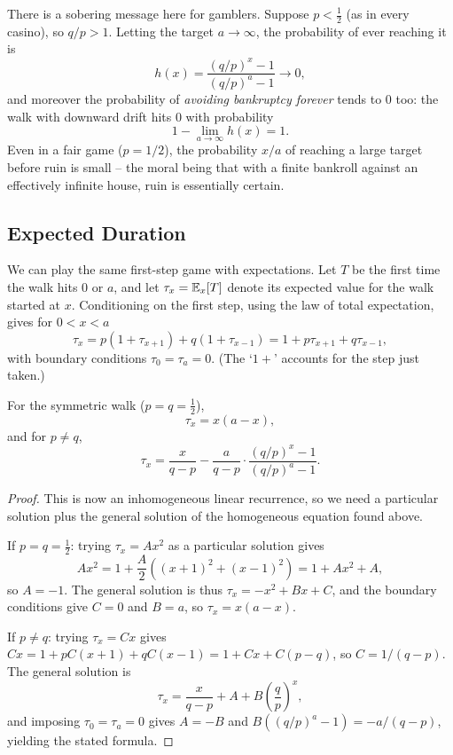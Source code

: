 \documentclass[a4paper]{scrartcl}
\begin{document}
There is a sobering message here for gamblers. Suppose $p < \frac12$ (as in every casino), so $q/p > 1$. Letting the target $a \rightarrow \infty$, the probability of ever reaching it is
$$
h(x) = \frac{(q/p)^x - 1}{(q/p)^a - 1} \longrightarrow 0,
$$
and moreover the probability of \emph{avoiding bankruptcy forever} tends to $0$ too: the walk with downward drift hits $0$ with probability
$$
1 - \lim_{a \to \infty}h(x) = 1.
$$
Even in a fair game ($p = 1/2$), the probability $x/a$ of reaching a large target before ruin is small -- the moral being that with a finite bankroll against an effectively infinite house, ruin is essentially certain.

\subsection{Expected Duration}

We can play the same first-step game with expectations. Let $T$ be the first time the walk hits $0$ or $a$, and let $\tau_x = \mathbb{E}_x[T]$ denote its expected value for the walk started at $x$. Conditioning on the first step, using the law of total expectation, gives for $0 < x < a$
$$
\tau_x = p(1 + \tau_{x + 1}) + q(1 + \tau_{x - 1}) = 1 + p\tau_{x+1} + q\tau_{x - 1},
$$
with boundary conditions $\tau_0 = \tau_a = 0$. (The `$1 +$' accounts for the step just taken.)

\begin{proposition}
	For the symmetric walk ($p = q = \frac12$),
	$$
	\tau_x = x(a - x),
	$$
	and for $p \neq q$,
	$$
	\tau_x = \frac{x}{q - p} - \frac{a}{q - p}\cdot \frac{(q/p)^x - 1}{(q/p)^a - 1}.
	$$
\end{proposition}
\begin{proof}
	This is now an inhomogeneous linear recurrence, so we need a particular solution plus the general solution of the homogeneous equation found above.

	If $p = q = \frac12$: trying $\tau_x = Ax^2$ as a particular solution gives
	$$
	Ax^2 = 1 + \frac{A}{2}\left((x+1)^2 + (x-1)^2\right) = 1 + Ax^2 + A,
	$$
	so $A = -1$. The general solution is thus $\tau_x = -x^2 + Bx + C$, and the boundary conditions give $C = 0$ and $B = a$, so $\tau_x = x(a - x)$.

	If $p \neq q$: trying $\tau_x = Cx$ gives $Cx = 1 + pC(x+1) + qC(x - 1) = 1 + Cx + C(p - q)$, so $C = 1/(q - p)$. The general solution is
	$$
	\tau_x = \frac{x}{q - p} + A + B\left(\frac{q}{p}\right)^x,
	$$
	and imposing $\tau_0 = \tau_a = 0$ gives $A = -B$ and $B\left((q/p)^a - 1\right) = -a/(q-p)$, yielding the stated formula.
\end{proof}
\end{document}

